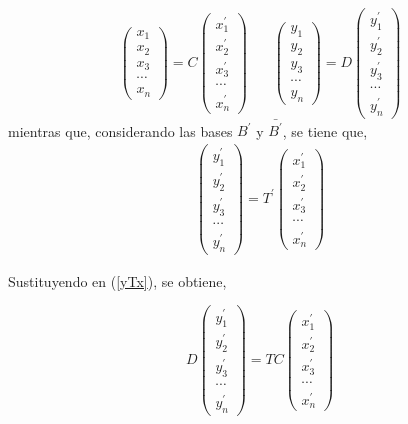 $$\left(\begin{array}{c} x_{1} \\ x_{2}  
\\  x_3 \\ \cdots \\ x_{n} 
\end{array} \right)=C\left(\begin{array}{c} x^{\prime}_{1} \\ x^{\prime}_{2}  
\\  x^{\prime}_3 \\ \cdots \\ x^{\prime}_{n} 
\end{array} \right)~~~~~~~~\left(\begin{array}{c} y_{1} \\ y_{2}  
\\  y_3 \\ \cdots \\ y_{n} 
\end{array} \right)=D\left(\begin{array}{c} y^{\prime}_{1} \\ y^{\prime}_{2}  
\\  y^{\prime}_3 \\ \cdots \\ y^{\prime}_{n} 
\end{array} \right)$$
\bigskip
mientras que, considerando las bases ${B^{\prime}}$ y   $\bar{B^{\prime}}$, se tiene que, 
\bigskip
\begin{eqnarray}
\label{yTpx}
\left(\begin{array}{c} y^{\prime}_{1} \\ y^{\prime}_{2}  
\\  y^{\prime}_3 \\ \cdots \\ y^{\prime}_{n} 
\end{array} \right)=T^{\prime}\left(\begin{array}{c} x^{\prime}_{1} \\ x^{\prime}_{2}  
\\  x^{\prime}_3 \\ \cdots \\ x^{\prime}_{n} 
\end{array} \right)
\end{eqnarray}
\bigskip



Sustituyendo en (\ref{yTx}),  se obtiene, 


$$D\left(\begin{array}{c} y^{\prime}_{1} \\ y^{\prime}_{2}  
\\  y^{\prime}_3 \\ \cdots \\ y^{\prime}_{n} 
\end{array} \right)=TC\left(\begin{array}{c} x^{\prime}_{1} \\ x^{\prime}_{2}  
\\  x^{\prime}_3 \\ \cdots \\ x^{\prime}_{n} 
\end{array} \right)$$

